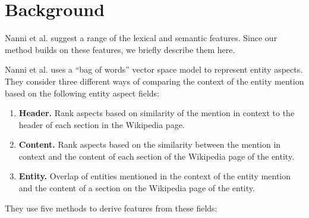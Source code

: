 \section{Background}
\label{sec:Background}
\label{subsubsec:Lexical and Semantic features} 
\label{entity-aspect-representation}

Nanni et al.\cite{nanni2018entity} suggest a range of the lexical and semantic features. Since our method builds on these features, we briefly describe them here.

Nanni et al. \cite{nanni2018entity} uses a ``bag of words'' vector space model to represent entity aspects. They consider three different ways of comparing the context of the entity mention based on the following entity aspect fields:


\begin{enumerate}

\item \textbf{Header.} Rank aspects based on similarity of the mention in context to the header of each section in the Wikipedia page.

\item \textbf{Content.} Rank aspects based on the similarity between the mention in context and the content of each section of the Wikipedia page of the entity.

\item \textbf{Entity.} Overlap of entities mentioned in the context of the entity mention and the content of a section on the Wikipedia page of the entity.
\end{enumerate}


They use five methods to derive features from these fields: 

